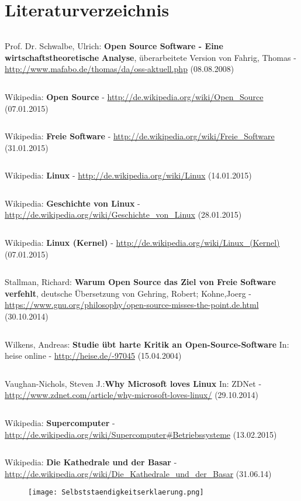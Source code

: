 \documentclass[a4paper,12pt]{article}
\begin{document}
\section{Literaturverzeichnis}
\begin{verbatim}
\end{verbatim}
Prof. Dr. Schwalbe, Ulrich: \textbf{Open Source Software - Eine wirtschaftstheoretische}
\newline
\textbf{Analyse}, überarbeitete Version von Fahrig, Thomas -
\newline
\url{http://www.mafabo.de/thomas/da/oss-aktuell.php} (08.08.2008)
\begin{verbatim}
\end{verbatim}
Wikipedia: \textbf{Open Source} - \url{http://de.wikipedia.org/wiki/Open_Source} (07.01.2015)
\begin{verbatim}
\end{verbatim}
Wikipedia: \textbf{Freie Software} - \url{http://de.wikipedia.org/wiki/Freie_Software} (31.01.2015)
\begin{verbatim}
\end{verbatim}
Wikipedia: \textbf{Linux} - \url{http://de.wikipedia.org/wiki/Linux} (14.01.2015)
\begin{verbatim}
\end{verbatim}
Wikipedia: \textbf{Geschichte von Linux} - \url{http://de.wikipedia.org/wiki/Geschichte_von_Linux} (28.01.2015)
\begin{verbatim}
\end{verbatim}
Wikipedia: \textbf{Linux (Kernel)} - \url{http://de.wikipedia.org/wiki/Linux_(Kernel)} (07.01.2015)
\begin{verbatim}
\end{verbatim}
Stallman, Richard: \textbf{Warum Open Source das Ziel von Freie Software verfehlt}, deutsche Übersetzung von Gehring, Robert; Kohne,Joerg - 
\newline
\url{https://www.gnu.org/philosophy/open-source-misses-the-point.de.html} (30.10.2014)
\begin{verbatim}
\end{verbatim}
Wilkens, Andreas: \textbf{Studie übt harte Kritik an Open-Source-Software} In: heise online - 
\newline
\url{http://heise.de/-97045} (15.04.2004)
\begin{verbatim}
\end{verbatim}
Vaughan-Nichols, Steven J.:\textbf{Why Microsoft loves Linux} In: ZDNet -
\newline
\url{http://www.zdnet.com/article/why-microsoft-loves-linux/} (29.10.2014)
\begin{verbatim}
\end{verbatim}
Wikipedia: \textbf{Supercomputer} - \url{http://de.wikipedia.org/wiki/Supercomputer#Betriebssysteme} (13.02.2015)
\begin{verbatim}
\end{verbatim}
Wikipedia: \textbf{Die Kathedrale und der Basar} - \\
\url{http://de.wikipedia.org/wiki/Die_Kathedrale_und_der_Basar} (31.06.14)
\newpage
\pagestyle{plain}
\begin{figure}
  \centering
  \texttt{[image: Selbststaendigkeitserklaerung.png]}
\end{figure}
\end{document}
